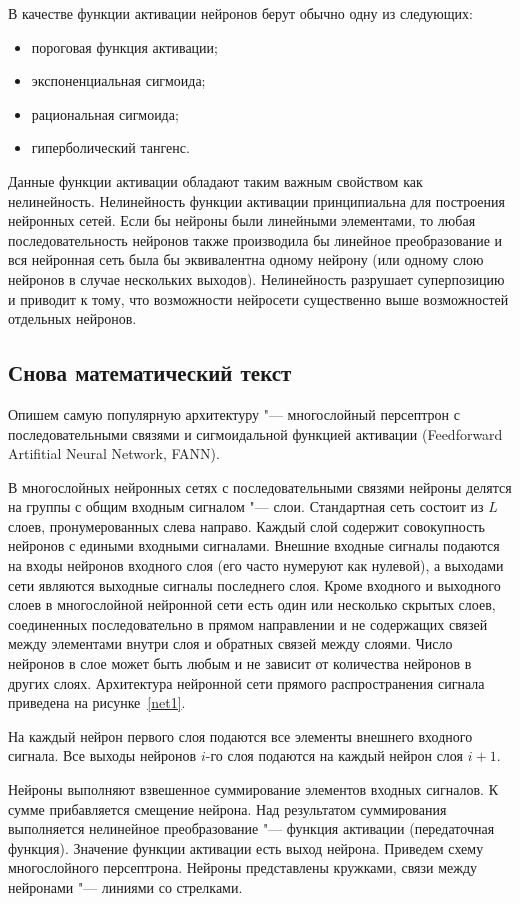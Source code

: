 \documentclass[bachelor, och, coursework]{SCWorks}
\begin{document}
В качестве функции активации нейронов берут обычно одну из
следующих:
\begin{itemize}
	\item пороговая функция активации;
	\item экспоненциальная сигмоида;
	\item рациональная сигмоида;
	\item гиперболический тангенс.
\end{itemize}

Данные функции активации обладают таким важным свойством как
нелинейность. Нелинейность функции активации принципиальна для
построения нейронных сетей. Если бы нейроны были линейными
элементами, то любая последовательность нейронов также производила
бы линейное преобразование и вся нейронная сеть была бы
эквивалентна одному нейрону (или одному слою нейронов в случае
нескольких выходов). Нелинейность разрушает суперпозицию и
приводит к тому, что возможности нейросети существенно выше
возможностей отдельных нейронов.

\subsection{Снова математический текст}
Опишем самую популярную архитектуру
"--- многослойный персептрон с последовательными связями и
сигмоидальной функцией активации (\foreignlanguage{english}{Feedforward Artifitial Neural
Network, FANN}).

В многослойных нейронных сетях с последовательными связями нейроны
делятся на группы с общим входным сигналом "--- слои. Стандартная
сеть состоит из $L$ слоев, пронумерованных слева направо. Каждый
слой содержит совокупность нейронов с едиными входными сигналами.
Внешние входные сигналы подаются на входы нейронов входного слоя
(его часто нумеруют как нулевой), а выходами сети являются
выходные сигналы последнего слоя. Кроме входного и выходного слоев
в многослойной нейронной сети есть один или несколько скрытых
слоев, соединенных последовательно в прямом направлении и не
содержащих связей между элементами внутри слоя и обратных связей
между слоями. Число нейронов в слое может быть любым и не зависит
от количества нейронов в других слоях. Архитектура нейронной сети
прямого распространения сигнала приведена на рисунке~\ref{net1}.

На каждый нейрон первого слоя подаются все элементы внешнего
входного сигнала. Все выходы нейронов $i$-го слоя подаются на
каждый нейрон слоя $i+1$.

Нейроны выполняют взвешенное суммирование элементов входных
сигналов. К сумме прибавляется смещение нейрона. Над результатом
суммирования выполняется нелинейное преобразование "--- функция
активации (передаточная функция). Значение функции активации есть
выход нейрона. Приведем схему многослойного персептрона. Нейроны
представлены кружками, связи между нейронами "--- линиями со
стрелками.
\end{document}
